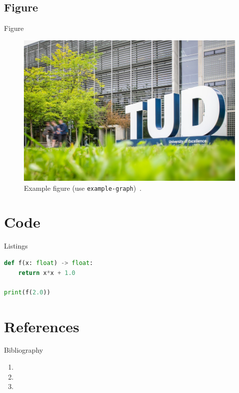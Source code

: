 \documentclass[aspectratio=169, xcolor=table]{beamer}
\begin{document}
\subsection{Figure}
\begin{frame}{Figure}
  \begin{figure}
    \centering
    \includegraphics[width=.62\linewidth]{../assets/example-graph}
    \caption{Example figure (use \texttt{example-graph})~\cite{clarke1964}.}
  \end{figure}
\end{frame}

\section{Code}
\begin{frame}[fragile]{Listings}
\begin{lstlisting}[language=Python,caption={Simple Python snippet}]
def f(x: float) -> float:
    return x*x + 1.0

print(f(2.0))
\end{lstlisting}
\end{frame}

\section{References}
\begin{frame}[allowframebreaks]{Bibliography}
  \footnotesize
  \begin{enumerate}
    \item {}
    \item {}
    \item {}
  \end{enumerate}
\end{frame}
\end{document}
